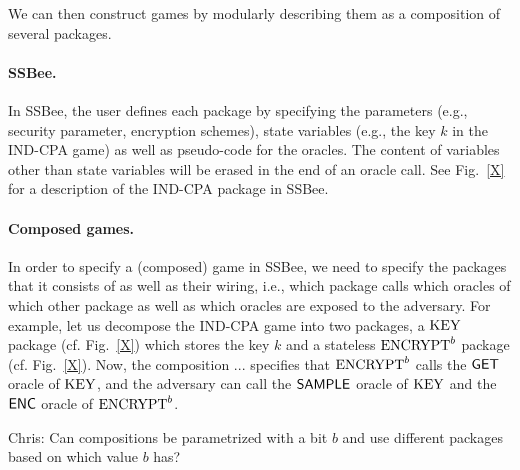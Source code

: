 We can then construct games by modularly describing them as a composition
of several packages.

\paragraph{SSBee.} In SSBee, the user defines each package by specifying
the parameters (e.g., security parameter, encryption schemes), state
variables (e.g., the key $k$ in the IND-CPA game) as well as pseudo-code
for the oracles. The content of variables other than state variables will
be erased in the end of an oracle call. See Fig.~\ref{X} for a description
of the IND-CPA package in SSBee.

\paragraph{Composed games.} In order to specify a (composed) game in SSBee, 
we need to specify the packages that it consists of as well as their wiring,
i.e., which package calls which oracles of which other package as well as
which oracles are exposed to the adversary. For example, let us
decompose the IND-CPA game into two packages, 
a $\text{\textrm{\upshape KEY}}$ package (cf. Fig.~\ref{X})
which stores the key $k$ and a stateless 
$\text{\textrm{\upshape ENCRYPT}}^b$ package (cf. Fig.~\ref{X}). Now, the composition ...
specifies that $\text{\textrm{\upshape ENCRYPT}}^b$ calls the $\mathsf{GET}$ oracle of $\text{\textrm{\upshape KEY}}$,
and the adversary can call the $\mathsf{SAMPLE}$ oracle of $\text{\textrm{\upshape KEY}}$ and the
$\mathsf{ENC}$ oracle of $\text{\textrm{\upshape ENCRYPT}}^b$.

{\color{blue}Chris: Can compositions be parametrized with a bit $b$ and
use different packages based on which value $b$ has?}


